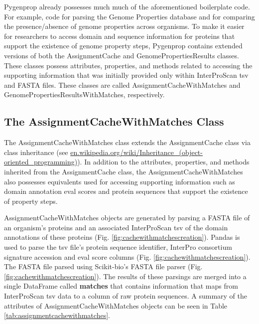 Pygenprop already possesses much much of the aforementioned boilerplate code. For example, code for parsing the Genome Properties database and for comparing the presence/absence of genome properties across organisms. To make it easier for researchers to access domain and sequence information for proteins that support the existence of genome property steps, Pygenprop contains extended versions of both the AssignmentCache and GenomePropertiesResults classes. These classes possess attributes, properties, and methods related to accessing the supporting information that was initially provided only within InterProScan \gls{tsv} and FASTA files. These classes are called AssignmentCacheWithMatches and GenomePropertiesResultsWithMatches, respectively.

\subsection{The AssignmentCacheWithMatches Class}

The AssignmentCacheWithMatches class extends the AssignmentCache class via class inheritance \cite{snyder1986encapsulation} (see \href{http://en.wikipedia.org/wiki/Inheritance_(object-oriented_programming)}{en.wikipedia.org/wiki/Inheritance\_(object-oriented\_programming)}). In addition to the attributes, properties, and methods inherited from the AssignmentCache class, the AssignmentCacheWithMatches also possesses equivalents used for accessing supporting information such as domain annotation \gls{eval} scores and protein sequences that support the existence of property steps.

AssignmentCacheWithMatches objects are generated by parsing a FASTA file \cite{pearson19905} of an organism's proteins and an associated InterProScan \gls{tsv} of the domain annotations of these proteins (Fig. \ref{fig:cachewithmatchescreation}). Pandas is used to parse the \gls{tsv} file's protein sequence identifier, InterPro consortium signature accession and \gls{eval} score columns (Fig. \ref{fig:cachewithmatchescreation}). The FASTA file parsed using Scikit-bio's FASTA file parser (Fig. \ref{fig:cachewithmatchescreation})\cite{scikitbio}. The results of these parsings are merged into a single DataFrame called \textbf{matches} that contains information that maps from InterProScan \gls{tsv} data to a column of raw protein sequences. A summary of the attributes of AssignmentCacheWithMatches objects can be seen in Table \ref{tab:assignmentcachewithmatches}.

